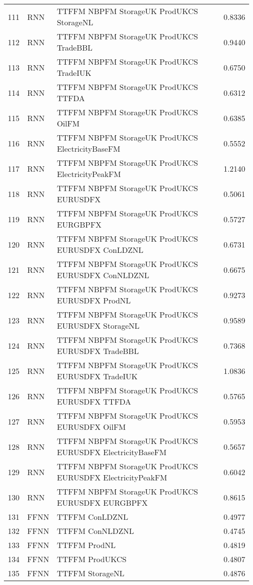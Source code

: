 \begin{table}[ht]
\begin{tabular}{rllr}
  111 & RNN & TTFFM NBPFM StorageUK ProdUKCS StorageNL & 0.8336 \\ 
  112 & RNN & TTFFM NBPFM StorageUK ProdUKCS TradeBBL & 0.9440 \\ 
  113 & RNN & TTFFM NBPFM StorageUK ProdUKCS TradeIUK & 0.6750 \\ 
  114 & RNN & TTFFM NBPFM StorageUK ProdUKCS TTFDA & 0.6312 \\ 
  115 & RNN & TTFFM NBPFM StorageUK ProdUKCS OilFM & 0.6385 \\ 
  116 & RNN & TTFFM NBPFM StorageUK ProdUKCS ElectricityBaseFM & 0.5552 \\ 
  117 & RNN & TTFFM NBPFM StorageUK ProdUKCS ElectricityPeakFM & 1.2140 \\ 
  118 & RNN & TTFFM NBPFM StorageUK ProdUKCS EURUSDFX & 0.5061 \\ 
  119 & RNN & TTFFM NBPFM StorageUK ProdUKCS EURGBPFX & 0.5727 \\ 
  120 & RNN & TTFFM NBPFM StorageUK ProdUKCS EURUSDFX ConLDZNL & 0.6731 \\ 
  121 & RNN & TTFFM NBPFM StorageUK ProdUKCS EURUSDFX ConNLDZNL & 0.6675 \\ 
  122 & RNN & TTFFM NBPFM StorageUK ProdUKCS EURUSDFX ProdNL & 0.9273 \\ 
  123 & RNN & TTFFM NBPFM StorageUK ProdUKCS EURUSDFX StorageNL & 0.9589 \\ 
  124 & RNN & TTFFM NBPFM StorageUK ProdUKCS EURUSDFX TradeBBL & 0.7368 \\ 
  125 & RNN & TTFFM NBPFM StorageUK ProdUKCS EURUSDFX TradeIUK & 1.0836 \\ 
  126 & RNN & TTFFM NBPFM StorageUK ProdUKCS EURUSDFX TTFDA & 0.5765 \\ 
  127 & RNN & TTFFM NBPFM StorageUK ProdUKCS EURUSDFX OilFM & 0.5953 \\ 
  128 & RNN & TTFFM NBPFM StorageUK ProdUKCS EURUSDFX ElectricityBaseFM & 0.5657 \\ 
  129 & RNN & TTFFM NBPFM StorageUK ProdUKCS EURUSDFX ElectricityPeakFM & 0.6042 \\ 
  130 & RNN & TTFFM NBPFM StorageUK ProdUKCS EURUSDFX EURGBPFX & 0.8615 \\ 
  131 & FFNN & TTFFM ConLDZNL & 0.4977 \\ 
  132 & FFNN & TTFFM ConNLDZNL & 0.4745 \\ 
  133 & FFNN & TTFFM ProdNL & 0.4819 \\ 
  134 & FFNN & TTFFM ProdUKCS & 0.4807 \\ 
  135 & FFNN & TTFFM StorageNL & 0.4876 \\ 

\end{tabular}
\end{table}
